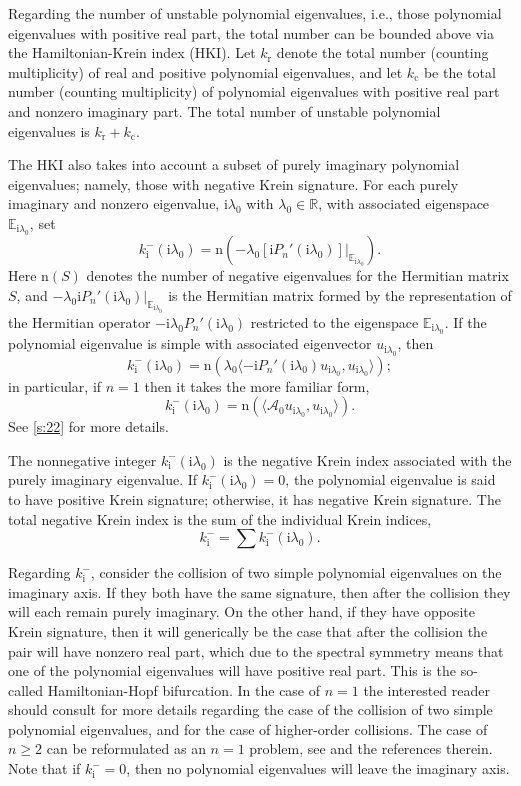 \documentclass[review,onefignum,onetabnum]{siamart171218}
\newcommand{\E}{\mathbb{E}}
\newcommand{\R}{\mathbb{R}}
\newcommand{\rmc}{\mathrm{c}}
\newcommand{\rmi}{\mathrm{i}}
\newcommand{\rmn}{\mathrm{n}}
\newcommand{\rmr}{\mathrm{r}}
\newcommand{\calA}{\mathcal{A}}
\newcommand{\vS}{\bm{\mathit{S}}}
\begin{document}
Regarding the number of unstable polynomial eigenvalues, i.e., those
polynomial eigenvalues with positive real part, the total number can be
bounded above via the Hamiltonian-Krein index (HKI). Let $k_\rmr$ denote the
total number (counting multiplicity) of real and positive polynomial
eigenvalues, and let $k_\rmc$ be the total number (counting multiplicity) of
polynomial eigenvalues with positive real part and nonzero imaginary part.
The total number of unstable polynomial eigenvalues is $k_\rmr+k_\rmc$.

The HKI also takes into account a subset of purely imaginary polynomial
eigenvalues; namely, those with negative Krein signature. For each purely
imaginary and nonzero eigenvalue, $\rmi\lambda_0$ with $\lambda_0\in\R$, with
associated eigenspace $\E_{\rmi\lambda_0}$, set
\[
k_\rmi^-(\rmi\lambda_0)=\rmn\left(-\lambda_0\left[\rmi P_n'(\rmi\lambda_0)\right]|_{\E_{\rmi\lambda_0}}\right).
\]
Here $\rmn(\vS)$ denotes the number of negative eigenvalues for the
Hermitian matrix $\vS$, and $-\lambda_0\rmi P_n'(\rmi\lambda_0)|_{\E_{\rmi\lambda_0}}$ is the Hermitian matrix formed by the representation of the Hermitian operator
$-\rmi\lambda_0P_n'(\rmi\lambda_0)$ restricted to the eigenspace
$\E_{\rmi\lambda_0}$. If the polynomial eigenvalue is simple with associated
eigenvector $u_{\rmi\lambda_0}$, then
\[
k_\rmi^-(\rmi\lambda_0)=
\rmn\left(\lambda_0\langle-\rmi P_n'(\rmi\lambda_0)u_{\rmi\lambda_0},u_{\rmi\lambda_0}\rangle\right);
\]
in particular, if $n=1$ then it takes the more familiar form,
\[
k_\rmi^-(\rmi\lambda_0)=
\rmn\left(\langle\calA_0u_{\rmi\lambda_0},u_{\rmi\lambda_0}\rangle\right).
\]
See \cref{s:22} for more details.

The nonnegative integer $k_\rmi^-(\rmi\lambda_0)$ is the negative Krein index
associated with the purely imaginary eigenvalue. If
$k_\rmi^-(\rmi\lambda_0)=0$, the polynomial eigenvalue is said to have
positive Krein signature; otherwise, it has negative Krein signature. The
total negative Krein index is the sum of the individual Krein indices,
\[
k_\rmi^-=\sum k_\rmi^-(\rmi\lambda_0).
\]

Regarding $k_\rmi^-$, consider the
collision of two simple polynomial eigenvalues on the imaginary axis. If they both have the same
signature, then after the collision they will each remain purely imaginary.
On the other hand, if they have opposite Krein signature, then it will
generically be the case that after the collision the pair will have nonzero
real part, which due to the spectral symmetry means that one of the
polynomial eigenvalues will have positive real part. This is the so-called Hamiltonian-Hopf bifurcation. In the case of $n=1$ the interested reader
should consult \cite[Chapter~7.1]{kapitula:sad13} for more details regarding
the case of the collision of two simple polynomial  eigenvalues, and
\cite{kapitula:tks10,vougalter:eoz06} for the case of higher-order
collisions. The case of $n\ge2$ can be reformulated as an $n=1$ problem, see \cite{kapitula:iif13} and the references therein.
Note that if $k_\rmi^-=0$, then no polynomial eigenvalues will leave the imaginary axis.
\end{document}
